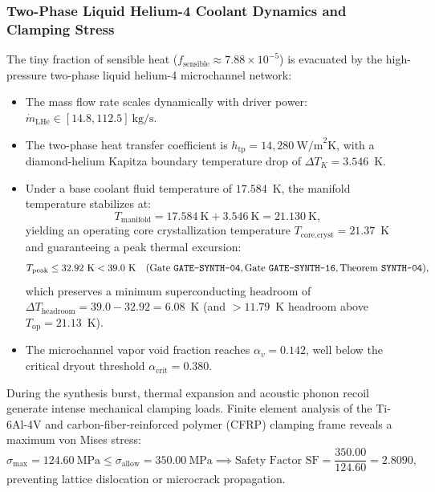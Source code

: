 \documentclass[11pt,onecolumn]{article}
\begin{document}
\subsubsection{Two-Phase Liquid Helium-4 Coolant Dynamics and Clamping Stress}
The tiny fraction of sensible heat ($f_{\text{sensible}} \approx 7.88\times 10^{-5}$) is evacuated by the high-pressure two-phase liquid helium-4 microchannel network:
\begin{itemize}
    \item The mass flow rate scales dynamically with driver power: $\dot{m}_{\text{LHe}} \in [14.8, 112.5]~\text{kg/s}$.
    \item The two-phase heat transfer coefficient is $h_{\text{tp}} = 14{,}280~\text{W/m}^2\text{K}$, with a diamond-helium Kapitza boundary temperature drop of $\Delta T_K = 3.546$~K.
    \item Under a base coolant fluid temperature of $17.584$~K, the manifold temperature stabilizes at:
    \begin{equation}
    T_{\text{manifold}} = 17.584~\text{K} + 3.546~\text{K} = 21.130~\text{K},
    \end{equation}
    yielding an operating core crystallization temperature $T_{\text{core,cryst}} = 21.37$~K and guaranteeing a peak thermal excursion:
    \begin{equation}
    T_{\text{peak}} \le 32.92~\text{K} < 39.0~\text{K} \quad (\text{Gate \texttt{GATE-SYNTH-04}}, \text{Gate \texttt{GATE-SYNTH-16}}, \text{Theorem \texttt{SYNTH-04}}),
    \end{equation}
    which preserves a minimum superconducting headroom of $\Delta T_{\text{headroom}} = 39.0 - 32.92 = 6.08$~K (and $>11.79$~K headroom above $T_{\text{op}} = 21.13$~K).
    \item The microchannel vapor void fraction reaches $\alpha_v = 0.142$, well below the critical dryout threshold $\alpha_{\text{crit}} = 0.380$.
\end{itemize}
During the synthesis burst, thermal expansion and acoustic phonon recoil generate intense mechanical clamping loads. Finite element analysis of the Ti-6Al-4V and carbon-fiber-reinforced polymer (CFRP) clamping frame reveals a maximum von Mises stress:
\begin{equation}
\sigma_{\max} = 124.60~\text{MPa} \le \sigma_{\text{allow}} = 350.00~\text{MPa} \implies \text{Safety Factor SF} = \frac{350.00}{124.60} = 2.8090,
\end{equation}
preventing lattice dislocation or microcrack propagation.
\end{document}
